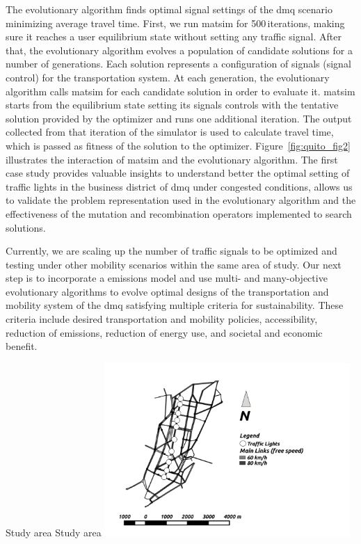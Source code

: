 The evolutionary algorithm finds optimal signal settings of the \gls{dmq} scenario minimizing average travel time. First, we run \gls{matsim} for 500\,iterations, making sure it reaches a user equilibrium state without setting any traffic signal. After that, the evolutionary algorithm evolves a population of candidate solutions for a number of generations. Each solution represents a configuration of signals (signal control) for the transportation system. At each generation, the evolutionary algorithm calls \gls{matsim} for each candidate solution in order to evaluate it. \gls{matsim} starts from the equilibrium state setting its signals controls with the tentative solution provided by the optimizer and runs one additional iteration. The output collected from that iteration of the simulator is used to calculate travel time, which is passed as fitness of the solution to the optimizer. Figure~\ref{fig:quito_fig2} illustrates the interaction of \gls{matsim} and the evolutionary algorithm. The first case study \citep[][]{ArmasEtAl_SEAL_2014} provides valuable insights to understand better the optimal setting of traffic lights in the business district of \gls{dmq} under congested conditions, allows us to validate the problem representation used in the evolutionary algorithm and the effectiveness of the mutation and recombination operators implemented to search solutions.

Currently, we are scaling up the number of traffic signals to be optimized and testing under other mobility scenarios within the same area of study. Our next step is to incorporate a emissions model and use multi- and many-objective evolutionary algorithms \citep[][]{AguireEtAl_EMO_2013} to evolve optimal designs of the transportation and mobility system of the \gls{dmq} satisfying multiple criteria for sustainability. These criteria include desired transportation and mobility policies, accessibility, reduction of emissions, reduction of energy use, and societal and economic benefit.

\createfigure%
{Study area}%
{Study area}%
{\label{fig:quito_fig1}}%
{\includegraphics[width=0.7\textwidth, angle=0]{./using/figures/qfig1.png}}%
{}

